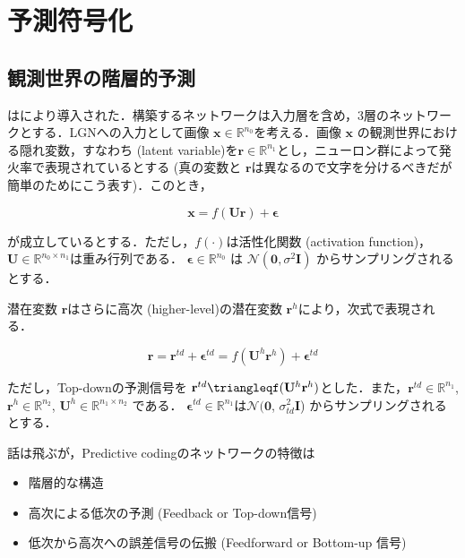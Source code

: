\section{予測符号化}
\subsection{観測世界の階層的予測}
\textbf{} は\cite{Rao1999-zv}により導入された．構築するネットワークは入力層を含め，3層のネットワークとする．LGNへの入力として画像 $\mathbf{x} \in \mathbb{R}^{n_0}$を考える．画像 $\mathbf{x}$ の観測世界における隠れ変数，すなわち\textbf{} (latent variable)を$\mathbf{r} \in \mathbb{R}^{n_1}$とし，ニューロン群によって発火率で表現されているとする (真の変数と $\mathbf{r}$は異なるので文字を分けるべきだが簡単のためにこう表す)．このとき，


\begin{equation}
\mathbf{x} = f(\mathbf{U}\mathbf{r}) + \boldsymbol{\epsilon}
\end{equation}


が成立しているとする．ただし，$f(\cdot)$は活性化関数 (activation function)，$\mathbf{U} \in \mathbb{R}^{n_0 \times n_1}$は重み行列である．
$\boldsymbol{\epsilon} \in \mathbb{R}^{n_0}$ は $\mathcal{N}(\mathbf{0}, \sigma^2 \mathbf{I})$ からサンプリングされるとする．

潜在変数 $\mathbf{r}$はさらに高次 (higher-level)の潜在変数 $\mathbf{r}^h$により，次式で表現される．


\begin{equation}
\mathbf{r} = \mathbf{r}^{td}+\boldsymbol{\epsilon}^{td}=f(\mathbf{U}^h \mathbf{r}^h)+\boldsymbol{\epsilon}^{td}
\end{equation}


ただし，Top-downの予測信号を $\mathbf{r}^{td}\triangleqf(\mathbf{U}^h \mathbf{r}^h)$とした．また，$\mathbf{r}^{td} \in \mathbb{R}^{n_1}$, $\mathbf{r}^{h} \in \mathbb{R}^{n_2}$, $\mathbf{U}^h \in \mathbb{R}^{n_1 \times n_2}$ である．
$\boldsymbol{\epsilon}^{td} \in \mathbb{R}^{n_1}$は$\mathcal{N}(\mathbf{0}$, $\sigma_{td}^2 \mathbf{I}$) からサンプリングされるとする．

話は飛ぶが，Predictive codingのネットワークの特徴は
\begin{itemize}
\item 階層的な構造
\item 高次による低次の予測 (Feedback or Top-down信号)
\item 低次から高次への誤差信号の伝搬 (Feedforward or Bottom-up 信号)
\end{itemize}

